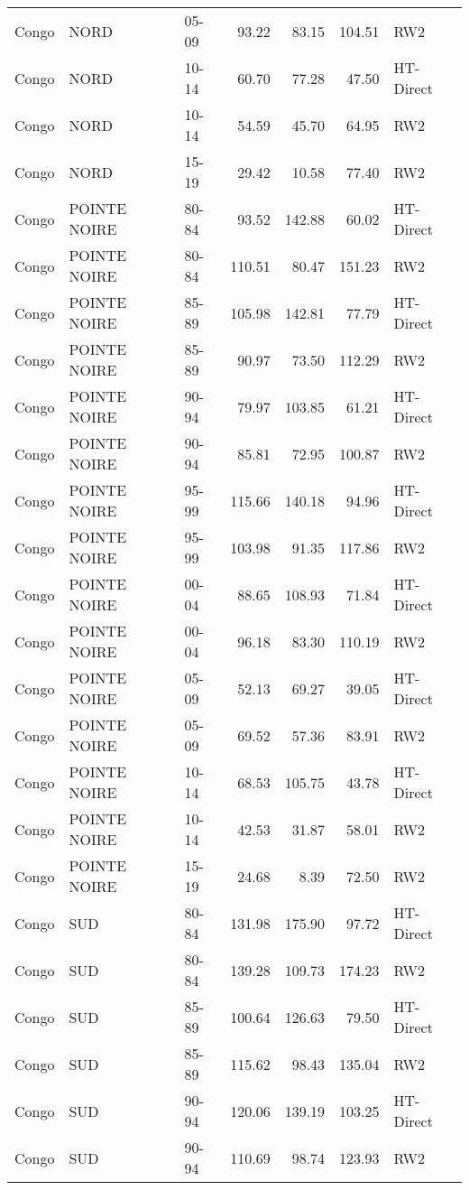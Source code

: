 \begin{longtable}{lllrrrl}
  Congo & NORD & 05-09 & 93.22 & 83.15 & 104.51 & RW2 \\ 
  Congo & NORD & 10-14 & 60.70 & 77.28 & 47.50 & HT-Direct \\ 
  Congo & NORD & 10-14 & 54.59 & 45.70 & 64.95 & RW2 \\ 
  Congo & NORD & 15-19 & 29.42 & 10.58 & 77.40 & RW2 \\ 
  Congo & POINTE NOIRE & 80-84 & 93.52 & 142.88 & 60.02 & HT-Direct \\ 
  Congo & POINTE NOIRE & 80-84 & 110.51 & 80.47 & 151.23 & RW2 \\ 
  Congo & POINTE NOIRE & 85-89 & 105.98 & 142.81 & 77.79 & HT-Direct \\ 
  Congo & POINTE NOIRE & 85-89 & 90.97 & 73.50 & 112.29 & RW2 \\ 
  Congo & POINTE NOIRE & 90-94 & 79.97 & 103.85 & 61.21 & HT-Direct \\ 
  Congo & POINTE NOIRE & 90-94 & 85.81 & 72.95 & 100.87 & RW2 \\ 
  Congo & POINTE NOIRE & 95-99 & 115.66 & 140.18 & 94.96 & HT-Direct \\ 
  Congo & POINTE NOIRE & 95-99 & 103.98 & 91.35 & 117.86 & RW2 \\ 
  Congo & POINTE NOIRE & 00-04 & 88.65 & 108.93 & 71.84 & HT-Direct \\ 
  Congo & POINTE NOIRE & 00-04 & 96.18 & 83.30 & 110.19 & RW2 \\ 
  Congo & POINTE NOIRE & 05-09 & 52.13 & 69.27 & 39.05 & HT-Direct \\ 
  Congo & POINTE NOIRE & 05-09 & 69.52 & 57.36 & 83.91 & RW2 \\ 
  Congo & POINTE NOIRE & 10-14 & 68.53 & 105.75 & 43.78 & HT-Direct \\ 
  Congo & POINTE NOIRE & 10-14 & 42.53 & 31.87 & 58.01 & RW2 \\ 
  Congo & POINTE NOIRE & 15-19 & 24.68 & 8.39 & 72.50 & RW2 \\ 
  Congo & SUD & 80-84 & 131.98 & 175.90 & 97.72 & HT-Direct \\ 
  Congo & SUD & 80-84 & 139.28 & 109.73 & 174.23 & RW2 \\ 
  Congo & SUD & 85-89 & 100.64 & 126.63 & 79.50 & HT-Direct \\ 
  Congo & SUD & 85-89 & 115.62 & 98.43 & 135.04 & RW2 \\ 
  Congo & SUD & 90-94 & 120.06 & 139.19 & 103.25 & HT-Direct \\ 
  Congo & SUD & 90-94 & 110.69 & 98.74 & 123.93 & RW2 \\ 

\end{longtable}
